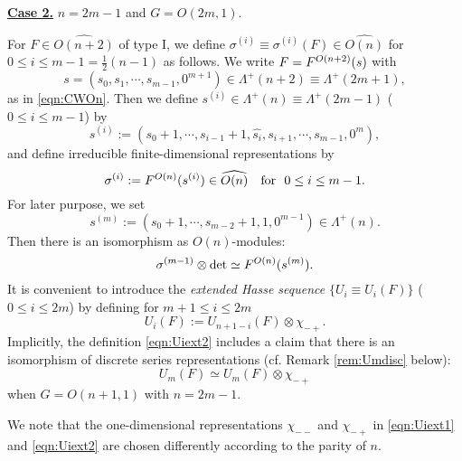 \vskip 1pc
\noindent
{\bf{\underline{Case 2.}}}\enspace
$n=2m-1$ and $G=O(2m,1)$.  

For $F \in \widehat{O(n+2)}$ of type I, 
 we define $\sigma^{(i)} \equiv \sigma^{(i)}(F) \in \widehat{O(n)}$
 for $0 \le i \le m-1 = \frac 1 2 (n-1)$
 as follows.  
We write $F= F^{{O(n+2)}}({s})$
 with 
\[
s=(s_{0},s_1,\cdots,s_{m-1},0^{m+1}) \in \Lambda^+(n+2)\equiv \Lambda^+(2m+1), 
\]
 as in \eqref{eqn:CWOn}.  
Then we define $s^{(i)}\in \Lambda^+(n)\equiv \Lambda^+(2m-1)$
 ($0 \le i \le m-1$) by
\begin{equation}
\label{eqn:sin=2m-1}
  s^{(i)}
  :=
  (s_{0}+1,\cdots,s_{i-1}+1,\widehat {s_{i}},s_{i+1},\cdots,s_{m-1},0^m), 
\end{equation}
and define irreducible finite-dimensional representations by 
\[
   \sigma^{(i)} : = F^{{O(n)}}({s^{(i)}}) \in \widehat{O(n)}
\quad
  \text{for }\,\, 0 \le i \le m-1.  
\]
For later purpose, we set
\[
s^{(m)}
  :=
  (s_{0}+1,\cdots,s_{m-2}+1,1,0^{m-1}) \in \Lambda^+(n). 
\]
Then there is an isomorphism as $O(n)$-modules: 
\[
  \sigma^{(m-1)} \otimes \det
  \simeq
  F^{{O(n)}}({s^{(m)}}).  
\]
It is convenient to introduce the {\em extended Hasse sequence } $\{U_i \equiv U_i(F)\}$
 ($0 \le i \le 2m$) by defining for
 $m+1 \le i \le 2m$ 
\begin{equation}
\label{eqn:Uiext2}
  U_i(F):= U_{n+1-i}(F) \otimes \chi_{-+}.  
\end{equation}
Implicitly,
 the definition \eqref{eqn:Uiext2} includes a claim 
 that there is an isomorphism
 of discrete series representations
 (cf. Remark \ref{rem:Umdisc} below):
\begin{equation}
\label{eqn:UmF-+}
   U_m(F) \simeq U_m(F) \otimes \chi_{-+}
\end{equation}
when $G=O(n+1,1)$ with $n=2m-1$.  



We note that the one-dimensional representations
 $\chi_{--}$ and $\chi_{-+}$ 
 in \eqref{eqn:Uiext1} and \eqref{eqn:Uiext2}
 are chosen differently 
 according to the parity of $n$.  



